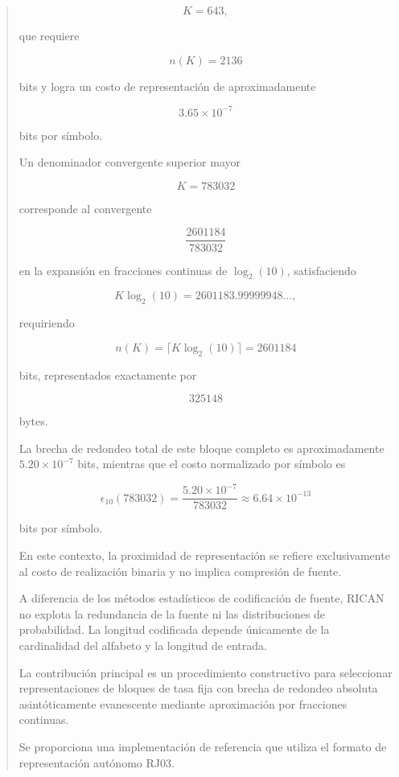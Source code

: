 \documentclass[onecolumn]{IEEEtran}
\begin{document}
\begin{abstract}
\[
K=643,
\]

que requiere

\[
n(K)=2136
\]

bits y logra un costo de representación de aproximadamente

\[
3.65\times10^{-7}
\]

bits por símbolo.

Un denominador convergente superior mayor

\[
K=783032
\]

corresponde al convergente

\[
\frac{2601184}{783032}
\]

en la expansión en fracciones continuas de $\log_2(10)$, satisfaciendo

\[
K\log_2(10)=2601183.99999948\ldots,
\]

requiriendo

\[
n(K)=\lceil K\log_2(10)\rceil=2601184
\]

bits, representados exactamente por

\[
325148
\]

bytes.

La brecha de redondeo total de este bloque completo es aproximadamente
$5.20\times10^{-7}$ bits, mientras que el costo normalizado por
símbolo es

\[
\epsilon_{10}(783032)
=
\frac{5.20\times10^{-7}}{783032}
\approx
6.64\times10^{-13}
\]

bits por símbolo.

En este contexto, la proximidad de representación se refiere
exclusivamente al costo de realización binaria y no implica
compresión de fuente.

A diferencia de los métodos estadísticos de codificación de fuente,
RICAN no explota la redundancia de la fuente ni las distribuciones de
probabilidad. La longitud codificada depende únicamente de la
cardinalidad del alfabeto y la longitud de entrada.

La contribución principal es un procedimiento constructivo para
seleccionar representaciones de bloques de tasa fija con brecha de
redondeo absoluta asintóticamente evanescente mediante aproximación
por fracciones continuas.

Se proporciona una implementación de referencia que utiliza el formato
de representación autónomo RJ03.

\end{abstract}

\end{document}
